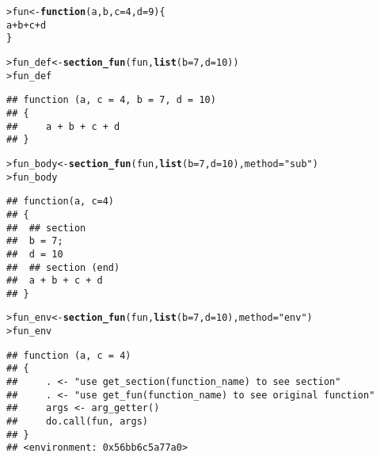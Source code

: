 \documentclass[11pt]{article}\usepackage[]{graphicx}\usepackage[]{xcolor}
\makeatletter
\newcommand{\hlnum}[1]{\textcolor[rgb]{0.686,0.059,0.569}{#1}}%
\newcommand{\hlstr}[1]{\textcolor[rgb]{0.192,0.494,0.8}{#1}}%
\newcommand{\hlopt}[1]{\textcolor[rgb]{0,0,0}{#1}}%
\newcommand{\hlstd}[1]{\textcolor[rgb]{0.345,0.345,0.345}{#1}}%
\newcommand{\hlkwa}[1]{\textcolor[rgb]{0.161,0.373,0.58}{\textbf{#1}}}%
\newcommand{\hlkwb}[1]{\textcolor[rgb]{0.69,0.353,0.396}{#1}}%
\newcommand{\hlkwc}[1]{\textcolor[rgb]{0.333,0.667,0.333}{#1}}%
\newcommand{\hlkwd}[1]{\textcolor[rgb]{0.737,0.353,0.396}{\textbf{#1}}}%
\newenvironment{kframe}{%
 \def\at@end@of@kframe{}%
 \ifinner\ifhmode%
  \def\at@end@of@kframe{\end{minipage}}%
  \begin{minipage}{\columnwidth}%
 \fi\fi%
 \def\FrameCommand##1{\hskip\@totalleftmargin \hskip-\fboxsep
 \colorbox{shadecolor}{##1}\hskip-\fboxsep
     \hskip-\linewidth \hskip-\@totalleftmargin \hskip\columnwidth}%
 \MakeFramed {\advance\hsize-\width
   \@totalleftmargin\z@ \linewidth\hsize
   \@setminipage}}%
 {\par\unskip\endMakeFramed%
 \at@end@of@kframe}
\newenvironment{knitrout}{}{} %
\makeatother
\begin{document}
\begin{knitrout}
\color{fgcolor}\begin{kframe}
\begin{alltt}
\hlstd{> }\hlstd{fun}  \hlkwb{<-} \hlkwa{function}\hlstd{(}\hlkwc{a}\hlstd{,} \hlkwc{b}\hlstd{,} \hlkwc{c}\hlstd{=}\hlnum{4}\hlstd{,} \hlkwc{d}\hlstd{=}\hlnum{9}\hlstd{)\{}
\hlstd{  }    \hlstd{a} \hlopt{+} \hlstd{b} \hlopt{+} \hlstd{c} \hlopt{+} \hlstd{d}
\hlstd{  }\hlstd{\}}
\end{alltt}
\end{kframe}
\end{knitrout}


\begin{knitrout}
\color{fgcolor}\begin{kframe}
\begin{alltt}
\hlstd{> }\hlstd{fun_def} \hlkwb{<-} \hlkwd{section_fun}\hlstd{(fun,} \hlkwd{list}\hlstd{(}\hlkwc{b}\hlstd{=}\hlnum{7}\hlstd{,} \hlkwc{d}\hlstd{=}\hlnum{10}\hlstd{))}
\hlstd{> }\hlstd{fun_def}
\end{alltt}
\begin{verbatim}
## function (a, c = 4, b = 7, d = 10) 
## {
##     a + b + c + d
## }
\end{verbatim}
\begin{alltt}
\hlstd{> }\hlstd{fun_body} \hlkwb{<-} \hlkwd{section_fun}\hlstd{(fun,} \hlkwd{list}\hlstd{(}\hlkwc{b}\hlstd{=}\hlnum{7}\hlstd{,} \hlkwc{d}\hlstd{=}\hlnum{10}\hlstd{),} \hlkwc{method}\hlstd{=}\hlstr{"sub"}\hlstd{)}
\hlstd{> }\hlstd{fun_body}
\end{alltt}
\begin{verbatim}
## function(a, c=4)
## { 
##  ## section
##  b = 7;
##  d = 10
##  ## section (end)
##  a + b + c + d
## }
\end{verbatim}
\begin{alltt}
\hlstd{> }\hlstd{fun_env} \hlkwb{<-} \hlkwd{section_fun}\hlstd{(fun,} \hlkwd{list}\hlstd{(}\hlkwc{b}\hlstd{=}\hlnum{7}\hlstd{,} \hlkwc{d}\hlstd{=}\hlnum{10}\hlstd{),} \hlkwc{method} \hlstd{=} \hlstr{"env"}\hlstd{)}
\hlstd{> }\hlstd{fun_env}
\end{alltt}
\begin{verbatim}
## function (a, c = 4) 
## {
##     . <- "use get_section(function_name) to see section"
##     . <- "use get_fun(function_name) to see original function"
##     args <- arg_getter()
##     do.call(fun, args)
## }
## <environment: 0x56bb6c5a77a0>
\end{verbatim}
\end{kframe}
\end{knitrout}
\end{document}
